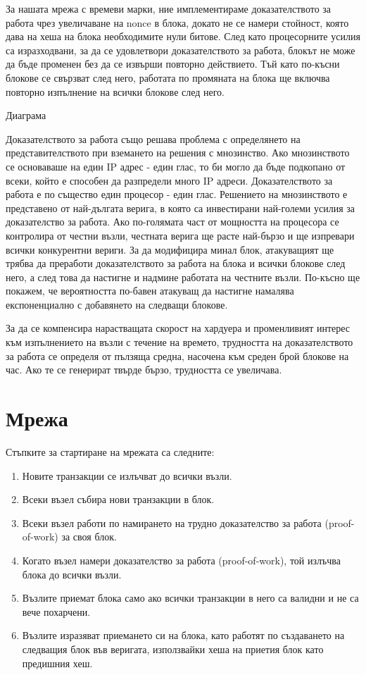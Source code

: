 \documentclass[11pt,a4paper]{article}
\begin{document}
За нашата мрежа с времеви марки, ние имплементираме доказателството за работа чрез увеличаване на nonce в блока, докато не се намери стойност, която дава на хеша на блока необходимите нули битове. След като процесорните усилия са изразходвани, за да се удовлетвори доказателството за работа, блокът не може да бъде променен без да се извърши повторно действието. Тъй като по-късни блокове се свързват след него, работата по промяната на блока ще включва повторно изпълнение на всички блокове след него.

Диаграма

Доказателството за работа също решава проблема с определянето на представителството при вземането на решения с мнозинство. Ако мнозинството се основаваше на един IP адрес - един глас, то би могло да бъде подкопано от всеки, който е способен да разпредели много IP адреси. Доказателството за работа е по същество един процесор - един глас. Решението на мнозинството е представено от най-дългата верига, в която са инвестирани най-големи усилия за доказателство за работа. Ако по-голямата част от мощността на процесора се контролира от честни възли, честната верига ще расте най-бързо и ще изпревари всички конкурентни вериги. За да модифицира минал блок, атакуващият ще трябва да преработи доказателството за работа на блока и всички блокове след него, а след това да настигне и надмине работата на честните възли. По-късно ще покажем, че вероятността по-бавен атакуващ да настигне намалява експоненциално с добавянето на следващи блокове.

За да се компенсира нарастващата скорост на хардуера и променливият интерес към изпълнението на възли с течение на времето, трудността на доказателството за работа се определя от пълзяща средна, насочена към среден брой блокове на час. Ако те се генерират твърде бързо, трудността се увеличава.

\section{Мрежа}
Стъпките за стартиране на мрежата са следните:

\begin{enumerate}
	\item Новите транзакции се излъчват до всички възли.
	\item Всеки възел събира нови транзакции в блок.
	\item Всеки възел работи по намирането на трудно доказателство за работа (proof-of-work) за своя блок.
	\item Когато възел намери доказателство за работа (proof-of-work), той излъчва блока до всички възли.
	\item Възлите приемат блока само ако всички транзакции в него са валидни и не са вече похарчени.
	\item Възлите изразяват приемането си на блока, като работят по създаването на следващия блок във веригата, използвайки хеша на приетия блок като предишния хеш.
\end{enumerate}
\end{document}
